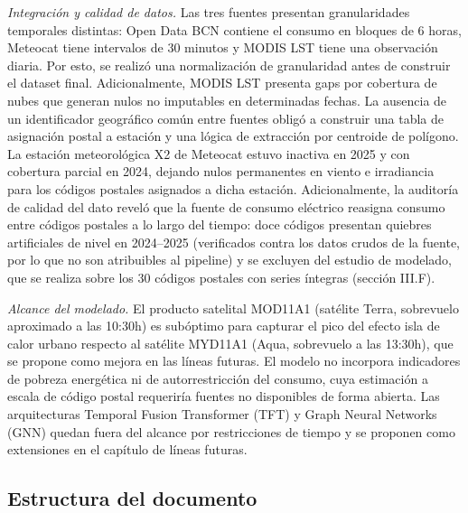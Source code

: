 \documentclass[12pt, a4paper]{article}
\begin{document}
\textit{Integración y calidad de datos.} Las tres fuentes presentan granularidades temporales distintas: Open Data BCN contiene el consumo en bloques de 6 horas, Meteocat tiene intervalos de 30 minutos y MODIS LST tiene una observación diaria. Por esto, se realizó una normalización de granularidad antes de construir el dataset final. Adicionalmente, MODIS LST presenta gaps por cobertura de nubes que generan nulos no imputables en determinadas fechas. La ausencia de un identificador geográfico común entre fuentes obligó a construir una tabla de asignación postal a estación y una lógica de extracción por centroide de polígono. La estación meteorológica X2 de Meteocat estuvo inactiva en 2025 y con cobertura parcial en 2024, dejando nulos permanentes en viento e irradiancia para los códigos postales asignados a dicha estación. Adicionalmente, la auditoría de calidad del dato reveló que la fuente de consumo eléctrico reasigna consumo entre códigos postales a lo largo del tiempo: doce códigos presentan quiebres artificiales de nivel en 2024--2025 (verificados contra los datos crudos de la fuente, por lo que no son atribuibles al pipeline) y se excluyen del estudio de modelado, que se realiza sobre los 30 códigos postales con series íntegras (sección III.F).

\textit{Alcance del modelado.} El producto satelital MOD11A1 (satélite Terra, sobrevuelo aproximado a las 10:30h) es subóptimo para capturar el pico del efecto isla de calor urbano respecto al satélite MYD11A1 (Aqua, sobrevuelo a las 13:30h), que se propone como mejora en las líneas futuras. El modelo no incorpora indicadores de pobreza energética ni de autorrestricción del consumo, cuya estimación a escala de código postal requeriría fuentes no disponibles de forma abierta. Las arquitecturas Temporal Fusion Transformer (TFT) y Graph Neural Networks (GNN) quedan fuera del alcance por restricciones de tiempo y se proponen como extensiones en el capítulo de líneas futuras.

\subsection{Estructura del documento}
\end{document}
